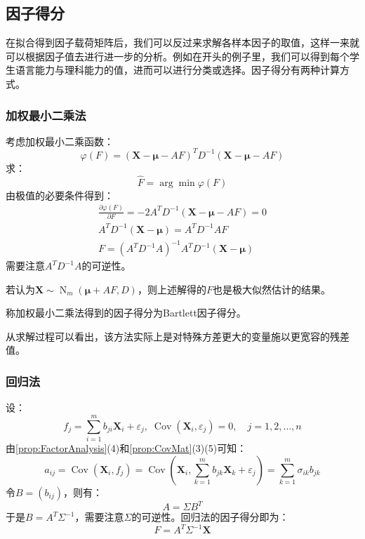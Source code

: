 \subsection{因子得分}
在拟合得到因子载荷矩阵后，我们可以反过来求解各样本因子的取值，这样一来就可以根据因子值去进行进一步的分析。例如在开头的例子里，我们可以得到每个学生语言能力与理科能力的值，进而可以进行分类或选择。因子得分有两种计算方式。
\subsubsection{加权最小二乘法}
\begin{derivation}
	考虑加权最小二乘函数：
	\begin{equation*}
		\varphi(F)=(\mathbf{X}-\boldsymbol{\mu}-AF)^TD^{-1}(\mathbf{X}-\boldsymbol{\mu}-AF)
	\end{equation*}
	求：
	\begin{equation*}
		\hat{F}=\arg\min\varphi(F)
	\end{equation*}
	由极值的必要条件得到：
	\begin{gather*}
		\frac{\partial\varphi(F)}{\partial F}=-2A^TD^{-1}(\mathbf{X}-\boldsymbol{\mu}-AF)=0 \\
		A^TD^{-1}(\mathbf{X}-\boldsymbol{\mu})=A^TD^{-1}AF \\
		F=(A^TD^{-1}A)^{-1}A^TD^{-1}(\mathbf{X}-\boldsymbol{\mu})
	\end{gather*}
	需要注意$A^TD^{-1}A$的可逆性。\par
	若认为$\mathbf{X}\sim\operatorname{N}_m(\boldsymbol{\mu}+AF,D)$，则上述解得的$F$也是极大似然估计的结果。
\end{derivation}
\begin{definition}
	称加权最小二乘法得到的因子得分为Bartlett因子得分。
\end{definition}
从求解过程可以看出，该方法实际上是对特殊方差更大的变量施以更宽容的残差值。

\subsubsection{回归法}
\begin{derivation}
	设：
	\begin{equation*}
		f_j=\sum_{i=1}^{m}b_{ji}\mathbf{X}_i+\varepsilon_j,\;\operatorname{Cov}(\mathbf{X}_i,\varepsilon_j)=0,\quad j=1,2,\dots,n
	\end{equation*}
	由\cref{prop:FactorAnalysis}(4)和\cref{prop:CovMat}(3)(5)可知：
	\begin{equation*}
		a_{ij}=\operatorname{Cov}(\mathbf{X}_i,f_j)=\operatorname{Cov}\left(\mathbf{X}_i,\sum_{k=1}^{m}b_{jk}\mathbf{X}_k+\varepsilon_j\right)=\sum_{k=1}^{m}\sigma_{ik}b_{jk}
	\end{equation*}
	令$B=(b_{ij})$，则有：
	\begin{equation*}
		A=\Sigma B^T
	\end{equation*}
	于是$B=A^T\Sigma^{-1}$，需要注意$\Sigma$的可逆性。回归法的因子得分即为：
	\begin{equation*}
		F=A^T\Sigma^{-1}\mathbf{X}
	\end{equation*}
\end{derivation}